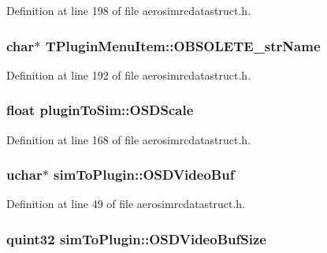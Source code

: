 \-Definition at line 198 of file aerosimrcdatastruct.\-h.

\hypertarget{group___aero_sim_r_c_ga99ed050ca0dfe8088a93046f72c044e7}{
\subsubsection[{\-O\-B\-S\-O\-L\-E\-T\-E\-\_\-str\-Name}]{\setlength{\rightskip}{0pt plus 5cm}char$\ast$ {\bf \-T\-Plugin\-Menu\-Item\-::\-O\-B\-S\-O\-L\-E\-T\-E\-\_\-str\-Name}}}\label{group___aero_sim_r_c_ga99ed050ca0dfe8088a93046f72c044e7}


\-Definition at line 192 of file aerosimrcdatastruct.\-h.

\hypertarget{group___aero_sim_r_c_ga96db301b2cf97e19ccd774f1b93dad21}{
\subsubsection[{\-O\-S\-D\-Scale}]{\setlength{\rightskip}{0pt plus 5cm}float {\bf plugin\-To\-Sim\-::\-O\-S\-D\-Scale}}}\label{group___aero_sim_r_c_ga96db301b2cf97e19ccd774f1b93dad21}


\-Definition at line 168 of file aerosimrcdatastruct.\-h.

\hypertarget{group___aero_sim_r_c_gadc2b5a377a36c5f5d2dfae169880bb1c}{
\subsubsection[{\-O\-S\-D\-Video\-Buf}]{\setlength{\rightskip}{0pt plus 5cm}uchar$\ast$ {\bf sim\-To\-Plugin\-::\-O\-S\-D\-Video\-Buf}}}\label{group___aero_sim_r_c_gadc2b5a377a36c5f5d2dfae169880bb1c}


\-Definition at line 49 of file aerosimrcdatastruct.\-h.

\hypertarget{group___aero_sim_r_c_ga9c59c8c051c445f8f8b17ed8b42a2820}{
\subsubsection[{\-O\-S\-D\-Video\-Buf\-Size}]{\setlength{\rightskip}{0pt plus 5cm}quint32 {\bf sim\-To\-Plugin\-::\-O\-S\-D\-Video\-Buf\-Size}}}\label{group___aero_sim_r_c_ga9c59c8c051c445f8f8b17ed8b42a2820}


